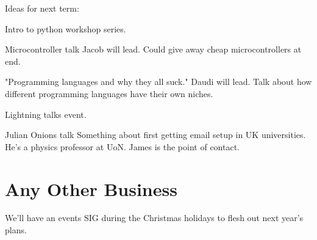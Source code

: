 \documentclass[11pt,hacksoc]{meetingmins}
\begin{document}
\begin{items}
\vspace{1.5em}
Ideas for next term:
\item Intro to python workshop series.
\item Microcontroller talk
\subitem Jacob will lead.
\subitem Could give away cheap microcontrollers at end.
\item "Programming languages and why they all suck."
\subitem Daudi will lead.
\subitem Talk about how different programming languages have their own niches.
\item Lightning talks event.
\item Julian Onions talk
\subitem Something about first getting email setup in UK universities.
\subitem He's a physics professor at UoN.
\subitem James is the point of contact.

\end{items}

\section{Any Other Business}

We’ll have an events SIG during the Christmas holidays to flesh out next year’s plans.

\vspace{1em}
\end{document}
